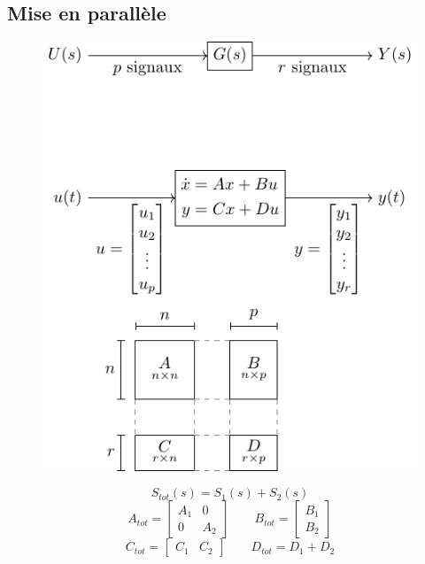 \documentclass[resume]{subfiles}
\begin{document}
\subsection{Mise en parallèle}
\begin{figure}[H]
\centering
\includegraphics[scale=1,page=3]{drwg_0.pdf}
\end{figure}
$$S_{tot}(s)=S_1(s)+S_2(s)$$
$$A_{tot}=\begin{bmatrix}
A_1 & 0\\0 & A_2
\end{bmatrix}\qquad B_{tot}=\begin{bmatrix}
B_1\\B_2
\end{bmatrix}$$
$$C_{tot}=\begin{bmatrix}
C_1 & C_2
\end{bmatrix}\qquad D_{tot}=D_1+D_2$$
\end{document}
